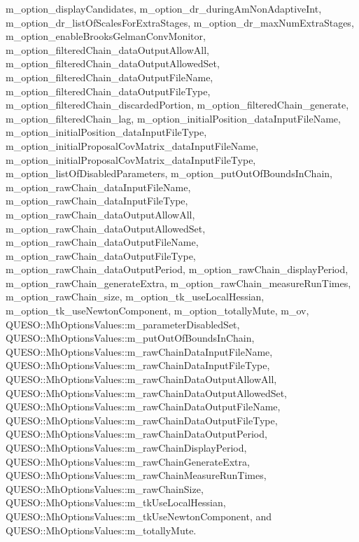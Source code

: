 m\-\_\-option\-\_\-display\-Candidates, m\-\_\-option\-\_\-dr\-\_\-during\-Am\-Non\-Adaptive\-Int, m\-\_\-option\-\_\-dr\-\_\-list\-Of\-Scales\-For\-Extra\-Stages, m\-\_\-option\-\_\-dr\-\_\-max\-Num\-Extra\-Stages, m\-\_\-option\-\_\-enable\-Brooks\-Gelman\-Conv\-Monitor, m\-\_\-option\-\_\-filtered\-Chain\-\_\-data\-Output\-Allow\-All, m\-\_\-option\-\_\-filtered\-Chain\-\_\-data\-Output\-Allowed\-Set, m\-\_\-option\-\_\-filtered\-Chain\-\_\-data\-Output\-File\-Name, m\-\_\-option\-\_\-filtered\-Chain\-\_\-data\-Output\-File\-Type, m\-\_\-option\-\_\-filtered\-Chain\-\_\-discarded\-Portion, m\-\_\-option\-\_\-filtered\-Chain\-\_\-generate, m\-\_\-option\-\_\-filtered\-Chain\-\_\-lag, m\-\_\-option\-\_\-initial\-Position\-\_\-data\-Input\-File\-Name, m\-\_\-option\-\_\-initial\-Position\-\_\-data\-Input\-File\-Type, m\-\_\-option\-\_\-initial\-Proposal\-Cov\-Matrix\-\_\-data\-Input\-File\-Name, m\-\_\-option\-\_\-initial\-Proposal\-Cov\-Matrix\-\_\-data\-Input\-File\-Type, m\-\_\-option\-\_\-list\-Of\-Disabled\-Parameters, m\-\_\-option\-\_\-put\-Out\-Of\-Bounds\-In\-Chain, m\-\_\-option\-\_\-raw\-Chain\-\_\-data\-Input\-File\-Name, m\-\_\-option\-\_\-raw\-Chain\-\_\-data\-Input\-File\-Type, m\-\_\-option\-\_\-raw\-Chain\-\_\-data\-Output\-Allow\-All, m\-\_\-option\-\_\-raw\-Chain\-\_\-data\-Output\-Allowed\-Set, m\-\_\-option\-\_\-raw\-Chain\-\_\-data\-Output\-File\-Name, m\-\_\-option\-\_\-raw\-Chain\-\_\-data\-Output\-File\-Type, m\-\_\-option\-\_\-raw\-Chain\-\_\-data\-Output\-Period, m\-\_\-option\-\_\-raw\-Chain\-\_\-display\-Period, m\-\_\-option\-\_\-raw\-Chain\-\_\-generate\-Extra, m\-\_\-option\-\_\-raw\-Chain\-\_\-measure\-Run\-Times, m\-\_\-option\-\_\-raw\-Chain\-\_\-size, m\-\_\-option\-\_\-tk\-\_\-use\-Local\-Hessian, m\-\_\-option\-\_\-tk\-\_\-use\-Newton\-Component, m\-\_\-option\-\_\-totally\-Mute, m\-\_\-ov, Q\-U\-E\-S\-O\-::\-Mh\-Options\-Values\-::m\-\_\-parameter\-Disabled\-Set, Q\-U\-E\-S\-O\-::\-Mh\-Options\-Values\-::m\-\_\-put\-Out\-Of\-Bounds\-In\-Chain, Q\-U\-E\-S\-O\-::\-Mh\-Options\-Values\-::m\-\_\-raw\-Chain\-Data\-Input\-File\-Name, Q\-U\-E\-S\-O\-::\-Mh\-Options\-Values\-::m\-\_\-raw\-Chain\-Data\-Input\-File\-Type, Q\-U\-E\-S\-O\-::\-Mh\-Options\-Values\-::m\-\_\-raw\-Chain\-Data\-Output\-Allow\-All, Q\-U\-E\-S\-O\-::\-Mh\-Options\-Values\-::m\-\_\-raw\-Chain\-Data\-Output\-Allowed\-Set, Q\-U\-E\-S\-O\-::\-Mh\-Options\-Values\-::m\-\_\-raw\-Chain\-Data\-Output\-File\-Name, Q\-U\-E\-S\-O\-::\-Mh\-Options\-Values\-::m\-\_\-raw\-Chain\-Data\-Output\-File\-Type, Q\-U\-E\-S\-O\-::\-Mh\-Options\-Values\-::m\-\_\-raw\-Chain\-Data\-Output\-Period, Q\-U\-E\-S\-O\-::\-Mh\-Options\-Values\-::m\-\_\-raw\-Chain\-Display\-Period, Q\-U\-E\-S\-O\-::\-Mh\-Options\-Values\-::m\-\_\-raw\-Chain\-Generate\-Extra, Q\-U\-E\-S\-O\-::\-Mh\-Options\-Values\-::m\-\_\-raw\-Chain\-Measure\-Run\-Times, Q\-U\-E\-S\-O\-::\-Mh\-Options\-Values\-::m\-\_\-raw\-Chain\-Size, Q\-U\-E\-S\-O\-::\-Mh\-Options\-Values\-::m\-\_\-tk\-Use\-Local\-Hessian, Q\-U\-E\-S\-O\-::\-Mh\-Options\-Values\-::m\-\_\-tk\-Use\-Newton\-Component, and Q\-U\-E\-S\-O\-::\-Mh\-Options\-Values\-::m\-\_\-totally\-Mute.



